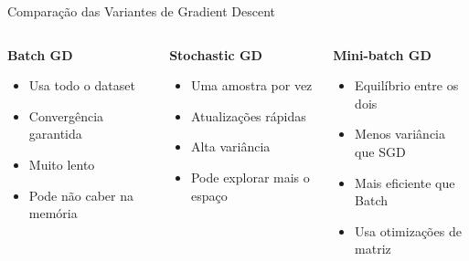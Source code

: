 \documentclass[aspectratio=1610]{beamer}
\begin{document}
\begin{frame}{Comparação das Variantes de Gradient Descent}
\begin{columns}
\begin{column}{0.3\textwidth}
\textbf{Batch GD}
\begin{itemize}
\item Usa todo o dataset
\item Convergência garantida
\item Muito lento
\item Pode não caber na memória
\end{itemize}
\end{column}
\begin{column}{0.3\textwidth}
\textbf{Stochastic GD}
\begin{itemize}
\item Uma amostra por vez
\item Atualizações rápidas
\item Alta variância
\item Pode explorar mais o espaço
\end{itemize}
\end{column}
\begin{column}{0.3\textwidth}
\textbf{Mini-batch GD}
\begin{itemize}
\item Equilíbrio entre os dois
\item Menos variância que SGD
\item Mais eficiente que Batch
\item Usa otimizações de matriz
\end{itemize}
\end{column}
\end{columns}
\end{frame}
\end{document}
